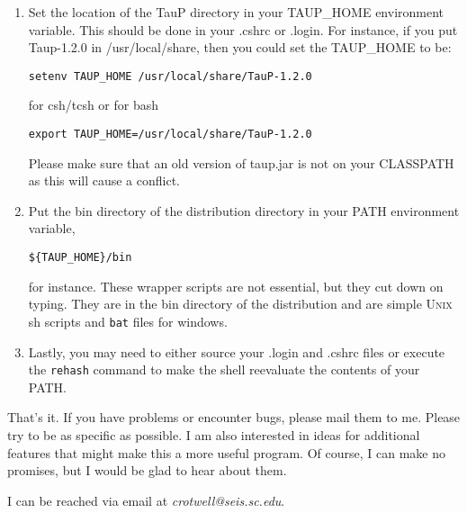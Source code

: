 \begin{enumerate}
\item Set the location of the TauP directory in your TAUP\_HOME environment variable.
This should be done in your .cshrc or .login. For instance, if you put Taup-1.2.0 in
/usr/local/share, then you could set the TAUP\_HOME to be:
\begin{verbatim}
setenv TAUP_HOME /usr/local/share/TauP-1.2.0
\end{verbatim}
for csh/tcsh or for bash
\begin{verbatim}
export TAUP_HOME=/usr/local/share/TauP-1.2.0
\end{verbatim}

Please make sure that an old version of taup.jar is not on your CLASSPATH as this will cause a
conflict.

\item Put the bin directory of the distribution directory in your PATH environment
variable, \begin{verbatim}${TAUP_HOME}/bin\end{verbatim} for instance. These wrapper
scripts are not essential, but they cut down on
typing. They are in the bin directory of the distribution
and are simple \textsc{Unix} sh scripts and \texttt{bat} files for windows.

\item Lastly, you may need to either source your .login and .cshrc files or
execute the \texttt{rehash} command to make the shell reevaluate the
contents of your PATH.

\end{enumerate}

That's it. If you have problems or encounter bugs, please mail them to me.
Please try to be as specific as possible. I am also interested in ideas for
additional features that might make this a more useful program.
Of course, I can make no promises,
but I would be glad to hear about them.

I can be reached via email at \textit{crotwell@seis.sc.edu}.
